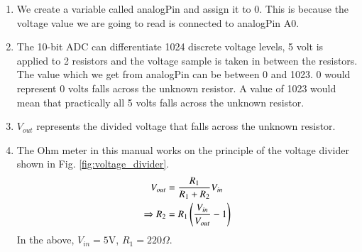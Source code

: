 \documentclass[journal,12pt,twocolumn]{IEEEtran}
\begin{document}
\begin{enumerate}


\item We create a variable called analogPin and assign it to 0. 
This is because the voltage value we are going to read is connected to analogPin A0.



\item  The 10-bit ADC can differentiate 1024 discrete voltage levels, 5 volt is applied to 2 resistors and the voltage sample is taken in between the resistors. The value which we get from analogPin can be between 0 and 1023. 0 would represent 0 volts falls across the unknown resistor. A value of 1023 would mean that practically all 5 volts falls across the unknown resistor.



\item  $V_{out}$ represents the divided voltage that falls across the unknown resistor.



\item  The Ohm meter in this manual works on the principle of the voltage divider shown in Fig. \ref{fig:voltage_divider}.
%
\begin{align}
V_{out}&=\frac{R_1}{R_1+R_2}V_{in} \\
\Rightarrow R_2&=R_1\left(\frac{V_{in}}{V_{out}}-1\right)
\end{align}
%
In the above, $V_{in} = 5$V, $R_1 = 220 \Omega$.
\end{enumerate}
\end{document}
